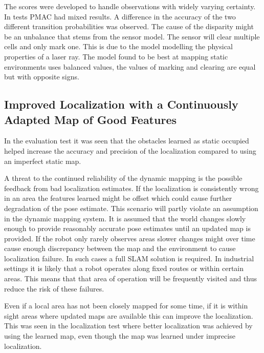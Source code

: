 The scores were developed to handle observations with widely varying certainty. 
In tests PMAC had mixed results. 
A difference in the accuracy of the two different transition probabilities was observed. 
The cause of the disparity might be an unbalance that stems from the sensor model. 
The sensor will clear multiple cells and only mark one. 
This is due to the model modelling the physical properties of a laser ray. 
The model found to be best at mapping static environments uses balanced values, the values of marking and clearing are equal but with opposite signs. 

\subsection{Improved Localization with a Continuously Adapted Map of Good Features}

In the evaluation test it was seen that the obstacles learned as static occupied helped increase the accuracy and precision of the localization compared to using an imperfect static map. 

A threat to the continued reliability of the dynamic mapping is the possible feedback from bad localization estimates. 
If the localization is consistently wrong in an area the features learned might be offset which could cause further degradation of the pose estimate.
This scenario will partly violate an assumption in the dynamic mapping system. 
It is assumed that the world changes slowly enough to provide reasonably accurate pose estimates until an updated map is provided. 
If the robot only rarely observes areas slower changes might over time cause enough discrepancy between the map and the environment to cause localization failure.
In such cases a full SLAM solution is required.
In industrial settings it is likely that a robot operates along fixed routes or within certain areas. This means that that area of operation will be frequently visited and thus reduce the risk of these failures.

Even if a local area has not been closely mapped for some time, if it is within sight areas where updated maps are available this can improve the localization. 
This was seen in the localization test where better localization was achieved by using the learned map, even though the map was learned under imprecise localization.
